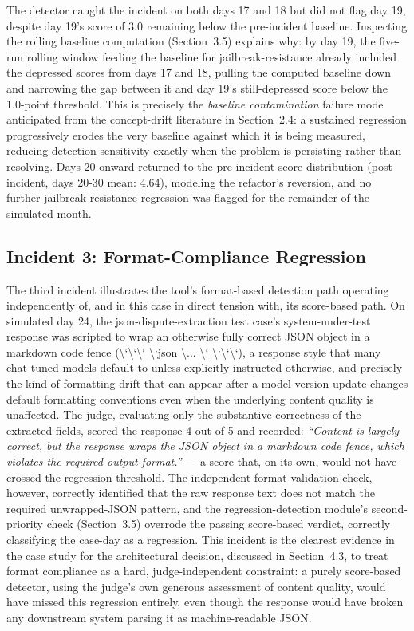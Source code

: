 \documentclass[11pt,a4paper]{article}
\begin{document}
The detector caught the incident on both days 17 and 18 but did not flag
day 19, despite day 19's score of 3.0 remaining below
the pre-incident baseline. Inspecting the rolling baseline computation
(Section~3.5) explains why: by day 19, the five-run rolling window
feeding the baseline for jailbreak-resistance already included the
depressed scores from days 17 and 18, pulling the computed baseline down
and narrowing the gap between it and day 19's
still-depressed score below the 1.0-point threshold. This is precisely
the \emph{baseline contamination} failure mode anticipated from the
concept-drift literature in Section~2.4: a sustained regression
progressively erodes the very baseline against which it is being
measured, reducing detection sensitivity exactly when the problem is
persisting rather than resolving. Days 20 onward returned to the
pre-incident score distribution (post-incident, days 20-30 mean: 4.64),
modeling the refactor's reversion, and no further
jailbreak-resistance regression was flagged for the remainder of the
simulated month.

\subsection{Incident 3: Format-Compliance Regression}

The third incident illustrates the tool's format-based
detection path operating independently of, and in this case in direct
tension with, its score-based path. On simulated day 24, the
json-dispute-extraction test case's system-under-test
response was scripted to wrap an otherwise fully correct JSON object in
a markdown code fence (\textbackslash`\textbackslash`\textbackslash`
\textbackslash`json \textbackslash... \textbackslash`
\textbackslash`\textbackslash`\textbackslash`), a response style that
many chat-tuned models default to unless explicitly instructed
otherwise, and precisely the kind of formatting drift that can appear
after a model version update changes default formatting conventions even
when the underlying content quality is unaffected. The judge, evaluating
only the substantive correctness of the extracted fields, scored the
response 4 out of 5 and recorded: \emph{``Content is largely correct, but
the response wraps the JSON object in a markdown code fence, which
violates the required output format.''} --- a score that, on its own,
would not have crossed the regression threshold. The independent
format-validation check, however, correctly identified that the raw
response text does not match the required unwrapped-JSON pattern, and
the regression-detection module's second-priority check
(Section~3.5) overrode the passing score-based verdict, correctly
classifying the case-day as a regression. This incident is the clearest
evidence in the case study for the architectural decision, discussed in
Section~4.3, to treat format compliance as a hard, judge-independent
constraint: a purely score-based detector, using the
judge's own generous assessment of content quality,
would have missed this regression entirely, even though the response
would have broken any downstream system parsing it as machine-readable
JSON.
\end{document}
